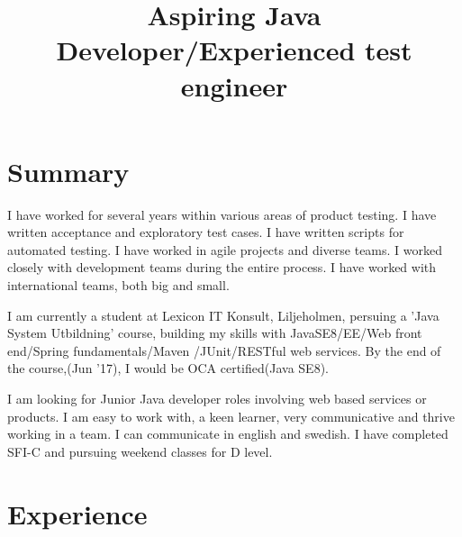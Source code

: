 \documentclass[12pt,a4paper,sans]{moderncv} %
\title{ Aspiring Java Developer/Experienced test engineer}
\begin{document}
\makecvtitle

\section{Summary}
I have worked for several years within various areas of product testing. I have written acceptance and exploratory test cases. I have written scripts for automated testing. I have
worked in agile projects and diverse teams. I worked closely with development teams during the entire process. I have worked with international teams, both big and small.

\hfill \break
I am currently a student at Lexicon IT Konsult, Liljeholmen, persuing a 'Java System Utbildning' course, building my skills with JavaSE8/EE/Web front end/Spring fundamentals/Maven
/JUnit/RESTful web services. By the end of the course,(Jun '17), I would be OCA certified(Java SE8).

\hfill \break
I am looking for Junior Java developer roles involving web based services or products. I am easy to work with,
a keen learner, very communicative and thrive working in a team. I can communicate in english and swedish.
I have completed SFI-C and pursuing weekend classes for D level.



\section{Experience}

\end{document}
